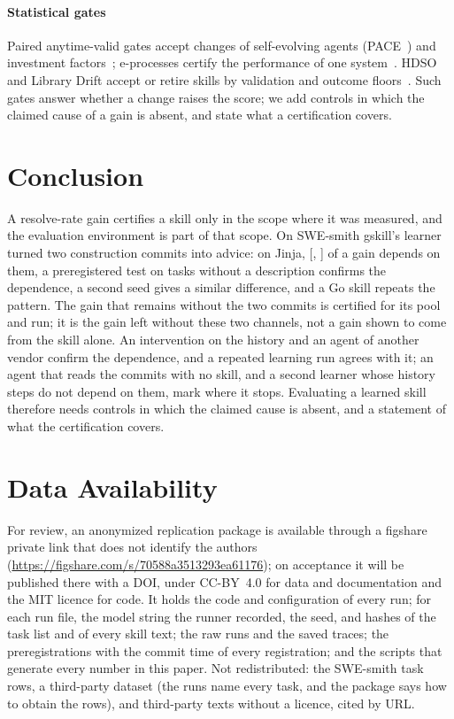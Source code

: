 \documentclass[sigconf,review,anonymous]{acmart}
\newcommand{\anonpackage}{\url{https://figshare.com/s/70588a3513293ea61176}}
\begin{document}
\paragraph{Statistical gates}
Paired anytime-valid gates accept changes of self-evolving agents (PACE~\cite{pace_paired_anytime_gate})
and investment factors~\cite{anytime_referee_2026}; e-processes certify the performance of one
system~\cite{celeus_2026,evaluator_2025}. HDSO and Library Drift accept or retire skills by
validation and outcome floors~\cite{hdso_2026,library_drift_2026}. Such gates answer whether a
change raises the score; we add controls in which the claimed cause of a gain is absent, and state
what a certification covers.

\section{Conclusion}
A resolve-rate gain certifies a skill only in the scope where it was measured, and the evaluation
environment is part of that scope. On SWE-smith gskill's learner turned two construction commits
into advice: on Jinja, \nleak{} [\nleakLo{}, \nleakHi{}] of a \njinjaGain{} gain depends on them, a
preregistered test on tasks without a description confirms the dependence, a second seed gives a
similar difference, and a Go skill repeats the pattern. The gain that remains without the two
commits is certified for its pool and run; it is the gain left without these two channels, not a
gain shown to come from the skill alone. An intervention on the history and an agent of another
vendor confirm the dependence, and a repeated learning run agrees with it; an agent that reads the commits with no skill, and a second learner whose
history steps do not depend on them, mark where it stops. Evaluating a learned skill therefore needs
controls in which the claimed cause is absent, and a statement of what the certification covers.

\section*{Data Availability}
For review, an anonymized replication package is available through a figshare private link that
does not identify the authors (\anonpackage{}); on acceptance it will be published there with a
DOI, under CC-BY~4.0 for data and documentation and the MIT licence for code. It holds the code and configuration
of every run; for each run file, the model string the runner recorded, the seed, and hashes of the
task list and of every skill text; the raw runs and the saved traces; the preregistrations with the
commit time of every registration; and the scripts that generate every number in this paper. Not
redistributed: the SWE-smith task rows, a third-party dataset (the runs name every task, and
the package says how to obtain the rows), and third-party texts without a licence, cited by URL.



\end{document}

